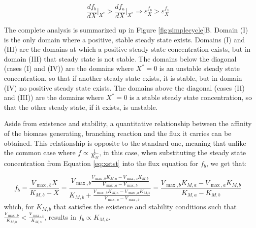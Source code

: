     \begin{equation*}
        \frac{df_b}{dX}\Big\vert_{X^*}>\frac{df_a}{dX}\Big\vert_{X^*} \Rightarrow \varepsilon^{f_b}_X>\varepsilon^{f_a}_X
    \end{equation*}
    
    The complete analysis is summarized up in Figure \ref{fig:simplecycle}B.
    Domain (I) is the only domain where a positive, stable steady state exists.
    Domains (I) and (III) are the domains at which a positive steady state concentration exists, but in domain (III) that steady state is not stable.
    The domains below the diagonal (cases (I) and (IV)) are the domains where $X^*=0$ is an unstable steady state concentration, so that if another steady state exists, it is stable, but in domain (IV) no positive steady state exists.
    The domains above the diagonal (cases (II) and (III)) are the domains where $X^*=0$ is a stable steady state concentration, so that the other steady state, if it exists, is unstable.

    Aside from existence and stability, a quantitative relationship between the affinity of the biomass generating, branching reaction and the flux it carries can be obtained.
    This relationship is opposite to the standard one, meaning that unlike the common case where $f\propto\frac{1}{K_M}$, in this case, when substituting the steady state concentration from Equation \ref{eq:xstst} into the flux equation for $f_b$, we get that:

    \begin{equation*}
        f_b=\frac{V_{\max,b}X}{K_{M,b}+X}=\frac{V_{\max,b}\frac{V_{\max,b}K_{M,a}-V_{\max,a}K_{M,b}}{V_{\max,a}-V_{\max,b}}}{K_{M,b}+\frac{V_{\max,b}K_{M,a}-V_{\max,a}K_{M,b}}{V_{\max,a}-V_{\max,b}}}=\frac{V_{\max,b}K_{M,a}-V_{\max,a}K_{M,b}}{K_{M,a}-K_{M,b}}
    \end{equation*}
    which, for $K_{M,b}$ that satisfies the existence and stability conditions such that $\frac{V_{\max,b}}{K_{M,b}}<\frac{V_{\max,a}}{K_{M,a}}$, results in $f_b \propto K_{M,b}$.

